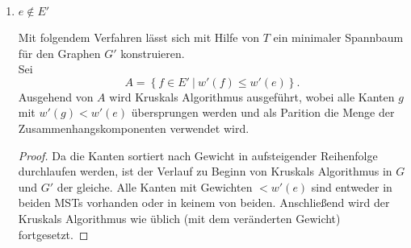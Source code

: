 \documentclass[a4paper]{scrartcl}
\begin{document}
\begin{enumerate}[(a)]
\begin{enumerate}[1.]
\begin{proof}
                \end{proof}

            \item $e \notin E'$ \\
                \begin{behaupt}
                    Mit folgendem Verfahren lässt sich mit Hilfe von $T$ ein
                    minimaler Spannbaum für den Graphen $G'$ konstruieren. \\

                    Sei
                    \begin{equation}
                        A = \left\{
                            f \in E' \ |\  w'(f) \leq w'(e)
                        \right\} \text{.}
                    \end{equation}
                    Ausgehend von $A$ wird Kruskals Algorithmus ausgeführt,
                    wobei alle Kanten $g$ mit $w'(g) < w'(e)$ übersprungen
                    werden und als Parition die Menge der
                    Zusammenhangskomponenten verwendet wird.
                \end{behaupt}
                \begin{proof}
                    Da die Kanten sortiert nach Gewicht in aufsteigender
                    Reihenfolge durchlaufen werden, ist der Verlauf zu Beginn
                    von Kruskals Algorithmus in $G$ und $G'$ der gleiche.
                    Alle Kanten mit Gewichten $< w'(e)$ sind entweder in beiden
                    MSTs vorhanden oder in keinem von beiden.
                    Anschließend wird der Kruskals Algorithmus wie üblich (mit
                    dem veränderten Gewicht) fortgesetzt.
                \end{proof}

        \end{enumerate}

\end{enumerate}
\end{document}
